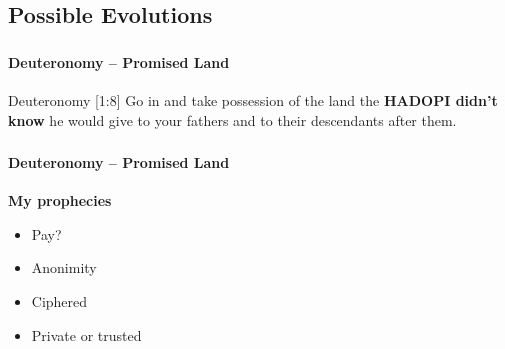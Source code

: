   \subsection{Possible Evolutions}
    \begin{frame}
      \frametitle{\subsecname}
      \framesubtitle{Deuteronomy -- Promised Land}

      \begin{block}{Deuteronomy [1:8]}
        Go in and take possession of the land the
        \textbf{\textsc{HADOPI} didn't know} he would give to your
        fathers and to their descendants after them.
      \end{block}
    \end{frame}

    \begin{frame}
      \frametitle{\subsecname}
      \framesubtitle{Deuteronomy -- Promised Land}

      {\large\bf My prophecies}
      \begin{itemize}
        \item { Pay?} \pause
        \item Anonimity
        \item Ciphered
        \item Private or trusted
      \end{itemize}
    \end{frame}
